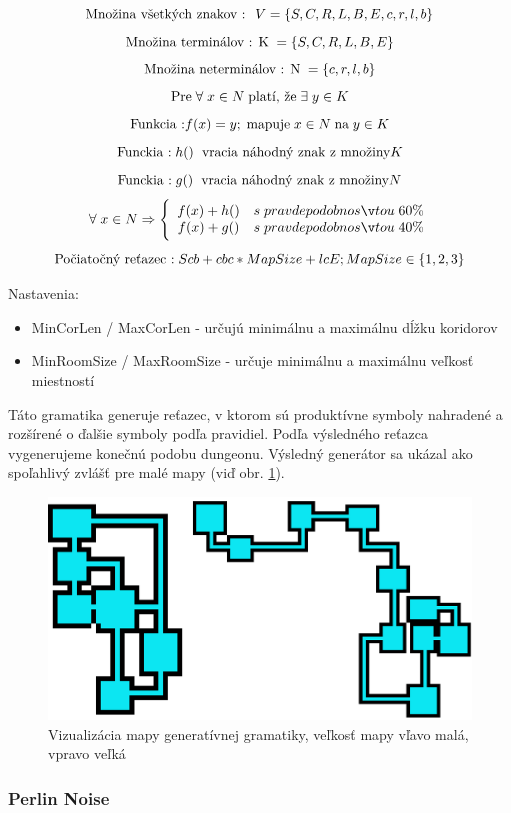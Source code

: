$$    \textnormal{Množina všetkých znakov : }\;V = \{ S, C, R, L, B, E, c, r, l, b \} $$
$$    \textnormal{Množina terminálov : K}\; = \{ S, C, R, L, B, E\} $$
$$    \textnormal{Množina neterminálov : N}\; = \{ c, r, l, b \} $$
$$    \textnormal{Pre}\;\forall\;x \in N\;\textnormal{platí, že}\;\exists\;y \in K $$
$$    \textnormal{Funkcia :} f(x) = y;\;\textnormal{mapuje}\;x \in N\;\textnormal{na}\;y \in K $$
$$    \textnormal{Funckia :}\;h()\;\textnormal{ vracia náhodný znak z množiny} K $$
$$    \textnormal{Funckia :}\;g()\;\textnormal{ vracia náhodný znak z množiny} N $$
$$    \forall\;x \in N \Rightarrow \Bigg\{ \begin{array}{c c} 
         f(x) + h() & s\;pravdepodobnosťou\;60\%\\ 
         f(x) + g() & s\;pravdepodobnosťou\;40\%\\ 
      \end{array} $$ 
$$    \textnormal{Počiatočný reťazec :}\;Scb + cbc * MapSize + lcE; MapSize \in \{1, 2, 3\} $$

\newpage
\noindent Nastavenia:

\begin{itemize}
    \item MinCorLen / MaxCorLen - určujú minimálnu a maximálnu dĺžku koridorov
    \item MinRoomSize / MaxRoomSize - určuje minimálnu a maximálnu veľkosť miestností
\end{itemize}

\noindent Táto gramatika generuje reťazec, v ktorom sú produktívne symboly nahradené a rozšírené o ďalšie symboly podľa pravidiel. Podľa výsledného reťazca vygenerujeme konečnú podobu dungeonu. Výsledný generátor sa ukázal ako spoľahlivý zvlášť pre malé mapy (viď obr. \ref{fig:gg}).

\begin{figure} [H]
    \centering
    \includegraphics[width=0.47\linewidth]{obrazky-figures/gg.png}
    \caption{Vizualizácia mapy generatívnej gramatiky, veľkosť mapy vľavo malá, vpravo veľká}
    \label{fig:gg}
\end{figure}

\subsubsection*{Perlin Noise}


